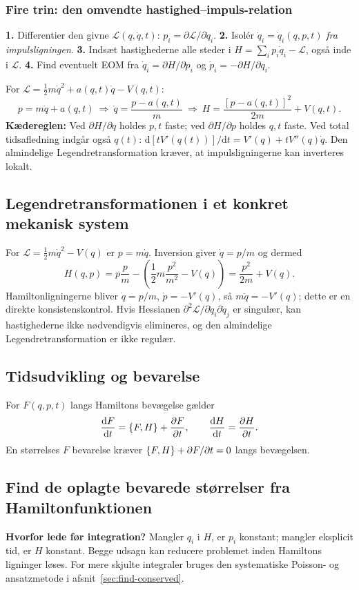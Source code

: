 \subsubsection*{Fire trin: den omvendte hastighed--impuls-relation}
\begin{method}\textbf{1.} Differentier den givne $\mathcal L(q,\dot q,t)$: $p_i=\partial\mathcal L/\partial\dot q_i$. \textbf{2.} Isolér $\dot q_i=\dot q_i(q,p,t)$ \emph{fra impulsligningen}. \textbf{3.} Indsæt hastighederne alle steder i $H=\sum_i p_i\dot q_i-\mathcal L$, også inde i $\mathcal L$. \textbf{4.} Find eventuelt EOM fra $\dot q_i=\partial H/\partial p_i$ og $\dot p_i=-\partial H/\partial q_i$.\end{method}
For $\mathcal L=\tfrac12m\dot q^2+a(q,t)\dot q-V(q,t)$:
\[p=m\dot q+a(q,t)\ \Rightarrow\ \dot q=\frac{p-a(q,t)}m\ \Rightarrow\ \boxed{H=\frac{[p-a(q,t)]^2}{2m}+V(q,t)}.\]
\textbf{Kædereglen:} Ved $\partial H/\partial q$ holdes $p,t$ faste; ved $\partial H/\partial p$ holdes $q,t$ faste. Ved total tidsafledning indgår også $q(t)$: $\mathrm d[tV'(q(t))]/\mathrm dt=V'(q)+tV''(q)\dot q$. Den almindelige Legendretransformation kræver, at impulsligningerne kan inverteres lokalt.

\subsection{Legendretransformationen i et konkret mekanisk system}
For $\mathcal L=\tfrac12m\dot q^2-V(q)$ er $p=m\dot q$. Inversion giver $\dot q=p/m$ og dermed
\[H(q,p)=p\frac pm-\left(\frac12m\frac{p^2}{m^2}-V(q)\right)=\frac{p^2}{2m}+V(q).\]
Hamiltonligningerne bliver $\dot q=p/m$, $\dot p=-V'(q)$, så $m\ddot q=-V'(q)$; dette er en direkte konsistenskontrol. Hvis Hessianen $\partial^2\mathcal L/\partial\dot q_i\partial\dot q_j$ er singulær, kan hastighederne ikke nødvendigvis elimineres, og den almindelige Legendretransformation er ikke regulær.

\subsection{Tidsudvikling og bevarelse}
For $F(q,p,t)$ langs Hamiltons bevægelse gælder
\[\frac{\mathrm d F}{\mathrm d t}=\left\{F,H\right\}+\frac{\partial F}{\partial t},\qquad \frac{\mathrm d H}{\mathrm d t}=\frac{\partial H}{\partial t}.\]
En størrelses $F$ bevarelse kræver $\left\{F,H\right\}+\partial F/\partial t=0$ langs bevægelsen.
\subsection{Find de oplagte bevarede størrelser fra Hamiltonfunktionen}\label{sec:ham-constants}
\textbf{Hvorfor lede før integration?} Mangler $q_i$ i $H$, er $p_i$ konstant; mangler eksplicit tid, er $H$ konstant. Begge udsagn kan reducere problemet inden Hamiltons ligninger løses. For mere skjulte integraler bruges den systematiske Poisson- og ansatzmetode i afsnit~\ref{sec:find-conserved}.


